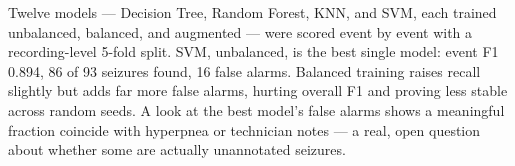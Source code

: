 \begin{summarybox}
Twelve models --- Decision Tree, Random Forest, KNN, and SVM, each trained unbalanced, balanced,
and augmented --- were scored event by event with a recording-level 5-fold split. SVM,
unbalanced, is the best single model: event F1 0.894, 86 of 93 seizures found, 16 false alarms.
Balanced training raises recall slightly but adds far more false alarms, hurting overall F1 and
proving less stable across random seeds. A look at the best model's false alarms shows a
meaningful fraction coincide with hyperpnea or technician notes --- a real, open question about
whether some are actually unannotated seizures.
\end{summarybox}
